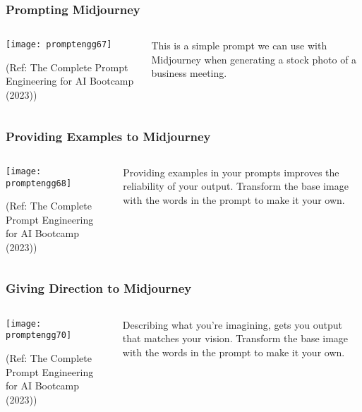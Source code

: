 \begin{frame}[fragile]\frametitle{Prompting Midjourney}


\begin{columns}
    \begin{column}[T]{0.6\linewidth}
		\begin{center}
		\texttt{[image: promptengg67]}

		{\tiny (Ref: The Complete Prompt Engineering for AI Bootcamp (2023))}
		\end{center}	
    \end{column}
    \begin{column}[T]{0.4\linewidth}
		This is a simple prompt we can use with Midjourney when generating a stock photo of a business meeting.
    \end{column}
  \end{columns}
\end{frame}

\begin{frame}[fragile]\frametitle{Providing Examples to Midjourney}


\begin{columns}
    \begin{column}[T]{0.6\linewidth}
		\begin{center}
		\texttt{[image: promptengg68]}

		{\tiny (Ref: The Complete Prompt Engineering for AI Bootcamp (2023))}
		\end{center}	
    \end{column}
    \begin{column}[T]{0.4\linewidth}
		Providing examples in your prompts improves the reliability of your output.
		Transform the base image with the words in the prompt to make it your own.
    \end{column}
  \end{columns}
\end{frame}

\begin{frame}[fragile]\frametitle{Giving Direction to Midjourney}


\begin{columns}
    \begin{column}[T]{0.6\linewidth}
		\begin{center}
		\texttt{[image: promptengg70]}

		{\tiny (Ref: The Complete Prompt Engineering for AI Bootcamp (2023))}
		\end{center}	
    \end{column}
    \begin{column}[T]{0.4\linewidth}
		Describing what you’re imagining, gets you output that matches your vision.
		Transform the base image with the words in the prompt to make it your own.
    \end{column}
  \end{columns}
\end{frame}

